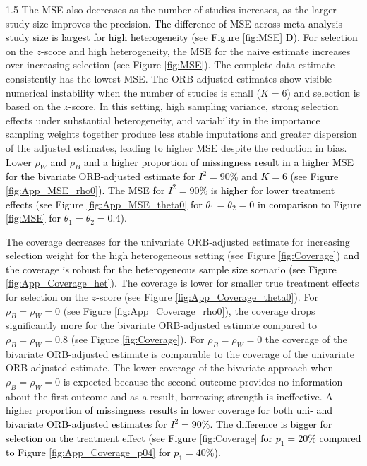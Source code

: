 \documentclass{article}
\newcommand{\mycolor}[1]{\textcolor{black}{#1}}
\begin{document}
\begin{spacing}{1.5}
The MSE also decreases as the number of studies increases, as the larger study size improves the precision. \mycolor{The difference of MSE across meta-analysis study size is largest for high heterogeneity (see Figure \ref{fig:MSE} D).} For selection on the $z$-score and high heterogeneity, the MSE for the naive estimate increases over increasing selection (see Figure \ref{fig:MSE}). The complete data estimate consistently has the lowest MSE. The ORB-adjusted estimates show visible numerical instability when the number of studies is small ($K = 6$) and selection is based on the $z$-score. In this setting, high sampling variance, strong selection effects under substantial heterogeneity, and variability in the importance sampling weights together produce less stable imputations and greater dispersion of the adjusted estimates, leading to higher MSE despite the reduction in bias. \mycolor{Lower $\rho_W$ and $\rho_B$ and a higher proportion of missingness result in a higher MSE for the bivariate ORB-adjusted estimate for $I^2 = 90\%$ and $K = 6$ (see Figure \ref{fig:App_MSE_rho0}). The MSE for $I^2 = 90\%$ is higher for lower treatment effects (see Figure \ref{fig:App_MSE_theta0} for $\theta_1 = \theta_2 = 0$ in comparison to Figure \ref{fig:MSE} for $\theta_1 = \theta_2 = 0.4$).}

The coverage decreases for the univariate ORB-adjusted estimate for increasing selection weight for the high heterogeneous setting (see Figure \ref{fig:Coverage}) \mycolor{and the coverage is robust for the heterogeneous sample size scenario (see Figure \ref{fig:App_Coverage_het})}. The coverage is lower for smaller true treatment effects for selection on the $z$-score (see Figure \ref{fig:App_Coverage_theta0}). 
For $\rho_B = \rho_W = 0$ (see Figure \ref{fig:App_Coverage_rho0}), the coverage drops significantly more for the bivariate ORB-adjusted estimate compared to $\rho_B = \rho_W = 0.8$ (see Figure \ref{fig:Coverage}). For $\rho_B = \rho_W = 0$ the coverage of the bivariate ORB-adjusted estimate is comparable to the coverage of the univariate ORB-adjusted estimate. The lower coverage of the bivariate approach when $\rho_B = \rho_W = 0$ is expected because the second outcome provides no information about the first outcome and as a result, borrowing strength is ineffective. \mycolor{A higher proportion of missingness results in lower coverage for both uni- and bivariate ORB-adjusted estimates for $I^2 = 90\%.$ The difference is bigger for selection on the treatment effect (see Figure \ref{fig:Coverage} for $p_1 = 20\%$ compared to Figure \ref{fig:App_Coverage_p04} for $p_1 = 40\%$)}.


\end{spacing}
\end{document}
